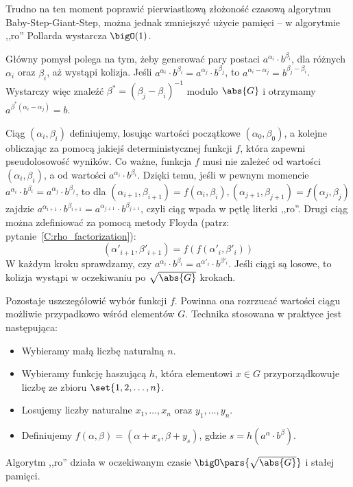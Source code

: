 Trudno na ten moment poprawić pierwiastkową złożoność czasową algorytmu Baby-Step-Giant-Step, można jednak zmniejszyć użycie pamięci -- w algorytmie ,,ro'' Pollarda wystarcza \( \bigO(1) \).

Główny pomysł polega na tym, żeby generować pary postaci \( a^{\alpha_i} \cdot b^{\beta_i} \), dla różnych \( \alpha_i \) oraz \( \beta_i \), aż wystąpi kolizja. Jeśli \( a^{\alpha_i} \cdot b^{\beta_i} = a^{\alpha_j} \cdot b^{\beta_j} \), to \( a^{\alpha_i - \alpha_j} = b^{\beta_j - \beta_i} \). Wystarczy więc znaleźć \( \beta^{*} = (\beta_j - \beta_i)^{-1} \) modulo \( \abs{G} \) i otrzymamy \( a^{\beta^{*} (\alpha_i - \alpha_j)} = b \).

Ciąg \( (\alpha_i, \beta_i) \) definiujemy, losując wartości początkowe \( (\alpha_0, \beta_0) \), a kolejne obliczając za pomocą jakiejś deterministycznej funkcji \( f \), która zapewni pseudolosowość wyników. Co ważne, funkcja \(f\) musi nie zależeć od wartości \((\alpha_i, \beta_i)\), a od wartości \(a^{\alpha_i} \cdot b^{\beta_i}\). Dzięki temu, jeśli w pewnym momencie \(a^{\alpha_i} \cdot b^{\beta_i} = a^{\alpha_j} \cdot b^{\beta_j} \), to dla \((\alpha_{i+1}, \beta_{i+1}) = f(\alpha_i, \beta_i), (\alpha_{j+1}, \beta_{j+1}) = f(\alpha_j, \beta_j)\) zajdzie \(a^{\alpha_{i+1}} \cdot b^{\beta_{i+1}} = a^{\alpha_{j+1}} \cdot b^{\beta_{j+1}}\), czyli ciąg wpada w pętlę literki ,,ro''. Drugi ciąg można zdefiniować za pomocą metody Floyda (patrz: pytanie~\ref{C:rho_factorization}):
\[ (\alpha'_{i+1}, \beta'_{i+1}) = f(f(\alpha'_i, \beta'_i)) \]
W każdym kroku sprawdzamy, czy \( a^{\alpha_i} \cdot b^{\beta_i} = a^{\alpha'_i} \cdot b^{\beta'_i} \). Jeśli ciągi są losowe, to kolizja wystąpi w oczekiwaniu po \( \sqrt{\abs{G}} \) krokach.

Pozostaje uszczegółowić wybór funkcji \( f \). Powinna ona rozrzucać wartości ciągu możliwie przypadkowo wśród elementów \( G \). Technika stosowana w praktyce jest następująca:
\begin{itemize}
	\onehalfspacing
	\item Wybieramy małą liczbę naturalną \( n \).
	\item Wybieramy funkcję haszującą \( h \), która elementowi \( x \in G \) przyporządkowuje liczbę ze zbioru \( \set{1, 2, \dots, n} \).
	\item Losujemy liczby naturalne \( x_1, \dots, x_n \) oraz \( y_1, \dots, y_n \).
	\item Definiujemy \( f(\alpha, \beta) = (\alpha + x_s, \beta + y_s) \), gdzie \( s = h(a^{\alpha} \cdot b^{\beta}) \).
\end{itemize}

Algorytm ,,ro'' działa w oczekiwanym czasie \( \bigO\pars{\sqrt{\abs{G}}} \) i stałej pamięci.